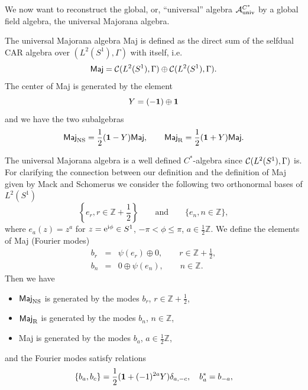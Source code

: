 \documentclass[10pt,a4paper]{article}
\begin{document}
We now want to reconstruct the global, or, ``universal''
algebra ${\cal A}_{\rm univ}^{C^*}$ by a global field
algebra, the universal Majorana algebra.
\begin{definition}
\label{Maj}
The universal Majorana algebra {\sf Maj} is defined as the
direct sum of the selfdual CAR algebra over
$(L^2(S^1),\Gamma)$ with itself, i.e.
\begin{equation}
\mbox{\sf Maj}= {\cal C}(L^2(S^1),\Gamma) \oplus
{\cal C}(L^2(S^1),\Gamma).
\end{equation}
The center of {\sf Maj} is generated by the element
\begin{equation}
Y= (-{\bf 1}) \oplus {\bf 1}
\end{equation}
and we have the two subalgebras
\begin{equation}
\mbox{\sf Maj}_{\rm NS}=\frac{1}{2}({\bf 1}-Y)\mbox{\sf Maj},
\qquad \mbox{\sf Maj}_{\rm R}=\frac{1}{2}({\bf 1}+Y)\mbox{\sf Maj}.
\end{equation}
\end{definition}
The universal Majorana algebra is a well defined
$C^*$-algebra since ${\cal C}(L^2(S^1),\Gamma)$ is. For
clarifying the connection between our definition and
the definition of {\sf Maj} given by Mack and Schomerus
\cite{MS1} we consider the following two orthonormal
bases of $L^2(S^1)$
\[ \left\{e_r, r\in\mathbb{Z}+\frac{1}{2}\right\} \qquad
\mbox{and} \qquad \{e_n, n\in\mathbb{Z} \}, \]
where $e_a(z)=z^a$ for $z={\rm e}^{{\rm i}\phi}\in S^1$,
$-\pi<\phi\le\pi$, $a\in\frac{1}{2}\mathbb{Z}$.
We define the elements of {\sf Maj} (Fourier modes)
\begin{eqnarray*}
b_r &=& \psi(e_r) \oplus 0 , \qquad r\in\mathbb{Z}+\frac{1}{2},\\
b_n &=& 0 \oplus \psi(e_n) , \qquad n\in\mathbb{Z}.
\end{eqnarray*}
Then we have
\begin{itemize}
\item $\mbox{\sf Maj}_{\rm NS}$ is generated by the modes
$b_r$, $r\in \mathbb{Z}+\frac{1}{2}$,
\item $\mbox{\sf Maj}_{\rm R}$ is generated by the modes
$b_n$, $n\in \mathbb{Z}$,
\item {\sf Maj} is generated by the modes
$b_a$, $a\in \frac{1}{2}\mathbb{Z}$,
\end{itemize}
and the Fourier modes satisfy relations
\begin{equation}
\{ b_a,b_c \} = \frac{1}{2} ({\bf 1}+(-1)^{2a}Y) \delta_{a,-c},
\quad b_a^*=b_{-a},
\end{equation}
\end{document}
